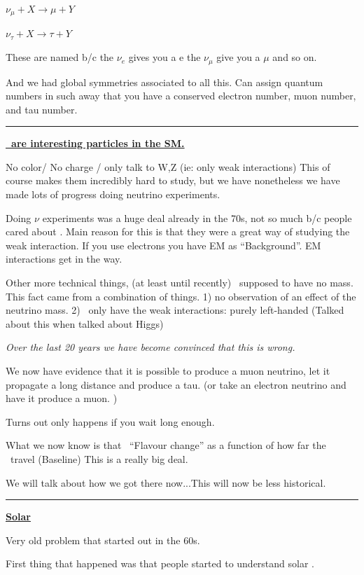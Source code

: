 {\begin{center}
$\nu_\mu + X \rightarrow \mu + Y $

$\nu_\tau + X  \rightarrow \tau + Y$
\end{center}

These are named b/c the $\nu_e$ gives you a e the $\nu_\mu$ give you a $\mu$ and so on. 

And we had global symmetries associated to all this. 
Can assign quantum numbers in such away that you have a  conserved electron number, muon number, and tau number.

\noindent\rule{\textwidth}{1pt}

\underline{\textbf{\nus\ are interesting particles in the SM. }}

No color/ No charge / only talk to W,Z  (ie: only weak interactions) 
This of course makes them incredibly hard to study, but we have nonetheless we have made lots of progress doing neutrino experiments. 

Doing $\nu$ experiments was a huge deal already in the 70s, not so much b/c people cared about \nus. 
Main reason for this is that they were a great way of studying the weak interaction. 
If you use electrons you have EM as ``Background''. 
EM interactions get in the way. 

Other more technical things, (at least until recently) \nus\ supposed to have no mass. 
This fact came from a combination of things. 
1) no observation of an effect of the neutrino mass. 
2) \nus\ only have the weak interactions: purely left-handed (Talked about this when talked about Higgs)

\textit{Over the last 20 years we have become convinced that this is wrong. }

We now have evidence that it is possible to produce a muon neutrino, let it propagate a long distance and produce a tau. 
(or take an electron neutrino and have it produce a muon. )

Turns out only happens if you wait long enough. 

What we now know is that \nus\ ``Flavour change'' as a function of how far the \nus\ travel (Baseline)
This is a really big deal. 

We will talk about how we got there now...This will now be less historical. 

\noindent\rule{\textwidth}{1pt}

\underline{\textbf{Solar \nus}}

Very old problem that started out in the 60s. 

First thing that happened was that people started to understand solar \nus.\

}
